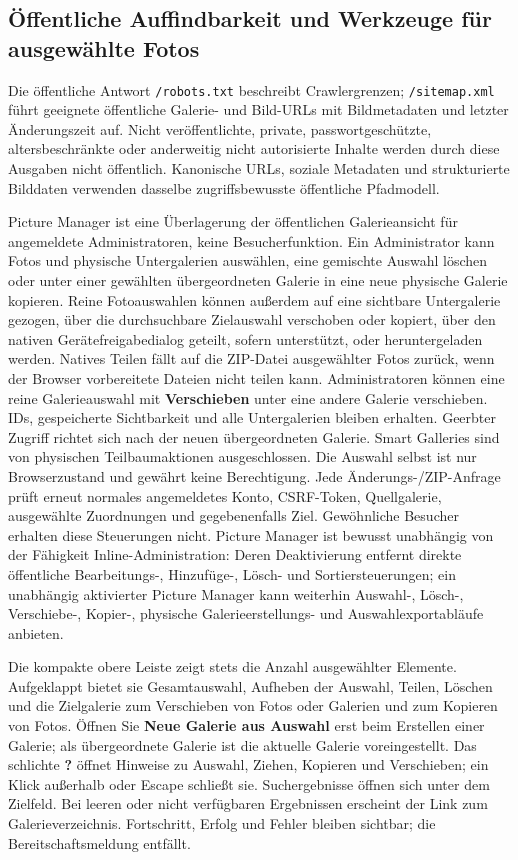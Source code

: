 \documentclass[11pt,a4paper]{article}
\newcommand{\ui}[1]{\textbf{#1}}
\newcommand{\codeword}[1]{\nolinkurl{#1}}
\begin{document}
\subsection{Öffentliche Auffindbarkeit und Werkzeuge für ausgewählte Fotos}

Die öffentliche Antwort \codeword{/robots.txt} beschreibt Crawlergrenzen;
\codeword{/sitemap.xml} führt geeignete öffentliche Galerie- und Bild-URLs mit
Bildmetadaten und letzter Änderungszeit auf. Nicht veröffentlichte, private,
passwortgeschützte, altersbeschränkte oder anderweitig nicht autorisierte
Inhalte werden durch diese Ausgaben nicht öffentlich. Kanonische URLs, soziale
Metadaten und strukturierte Bilddaten verwenden dasselbe zugriffsbewusste
öffentliche Pfadmodell.

Picture Manager ist eine Überlagerung der öffentlichen Galerieansicht für
angemeldete Administratoren, keine Besucherfunktion. Ein Administrator kann
Fotos und physische Untergalerien auswählen, eine gemischte Auswahl löschen oder
unter einer gewählten übergeordneten Galerie in eine neue physische Galerie
kopieren. Reine Fotoauswahlen können außerdem auf eine sichtbare Untergalerie
gezogen, über die durchsuchbare Zielauswahl verschoben oder kopiert, über den
nativen Gerätefreigabedialog geteilt, sofern unterstützt, oder heruntergeladen
werden. Natives Teilen fällt auf die ZIP-Datei ausgewählter Fotos zurück, wenn
der Browser vorbereitete Dateien nicht teilen kann. Administratoren können eine
reine Galerieauswahl mit \ui{Verschieben} unter eine andere Galerie verschieben.
IDs, gespeicherte Sichtbarkeit und alle Untergalerien bleiben erhalten. Geerbter
Zugriff richtet sich nach der neuen übergeordneten Galerie. Smart Galleries sind von
physischen Teilbaumaktionen ausgeschlossen. Die Auswahl selbst ist nur
Browserzustand und gewährt keine Berechtigung. Jede Änderungs-/ZIP-Anfrage prüft
erneut normales angemeldetes Konto, CSRF-Token, Quellgalerie, ausgewählte
Zuordnungen und gegebenenfalls Ziel. Gewöhnliche Besucher erhalten diese
Steuerungen nicht. Picture Manager ist bewusst unabhängig von der Fähigkeit
Inline-Administration: Deren Deaktivierung entfernt direkte öffentliche
Bearbeitungs-, Hinzufüge-, Lösch- und Sortiersteuerungen; ein unabhängig
aktivierter Picture Manager kann weiterhin Auswahl-, Lösch-, Verschiebe-,
Kopier-, physische Galerieerstellungs- und Auswahlexportabläufe anbieten.

Die kompakte obere Leiste zeigt stets die Anzahl ausgewählter Elemente.
Aufgeklappt bietet sie Gesamtauswahl, Aufheben der Auswahl, Teilen, Löschen
und die Zielgalerie zum Verschieben von Fotos oder Galerien und zum Kopieren
von Fotos. Öffnen Sie
\ui{Neue Galerie aus Auswahl} erst beim Erstellen einer Galerie; als
übergeordnete Galerie ist die aktuelle Galerie voreingestellt. Das schlichte
\ui{?} öffnet Hinweise zu Auswahl, Ziehen, Kopieren und Verschieben;
ein Klick außerhalb oder Escape schließt sie. Suchergebnisse öffnen sich unter
dem Zielfeld. Bei leeren oder nicht verfügbaren Ergebnissen erscheint der Link
zum Galerieverzeichnis. Fortschritt,
Erfolg und Fehler bleiben sichtbar; die Bereitschaftsmeldung entfällt.
\end{document}
